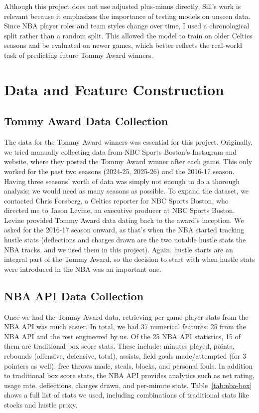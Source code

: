 \documentclass[11pt]{article}
\begin{document}
Although this project does not use adjusted plus-minus directly, Sill's work is relevant because it emphasizes the importance of testing models on unseen data. Since NBA player roles and team styles change over time, I used a chronological split rather than a random split. This allowed the model to train on older Celtics seasons and be evaluated on newer games, which better reflects the real-world task of predicting future Tommy Award winners.

\section{Data and Feature Construction}

\subsection{Tommy Award Data Collection}
The data for the Tommy Award winners was essential for this project. Originally, we tried manually collecting data from NBC Sports Boston's Instagram and website, where they posted the Tommy Award winner after each game. This only worked for the past two seasons (2024-25, 2025-26) and the 2016-17 season. Having three seasons' worth of data was simply not enough to do a thorough analysis; we would need as many seasons as possible. To expand the dataset, we contacted Chris Forsberg, a Celtics reporter for NBC Sports Boston, who directed me to Jason Levine, an executive producer at NBC Sports Boston. Levine provided Tommy Award data dating back to the award's inception. We asked for the 2016-17 season onward, as that's when the NBA started tracking hustle stats (deflections and charges drawn are the two notable hustle stats the NBA tracks, and we used them in this project). Again, hustle starts are an integral part of the Tommy Award, so the decision to start with when hustle stats were introduced in the NBA was an important one.

\subsection{NBA API Data Collection}
Once we had the Tommy Award data, retrieving per-game player stats from the NBA API was much easier. In total, we had 37 numerical features: 25 from the NBA API and the rest engineered by us. Of the 25 NBA API statistics, 15 of them are traditional box score stats. These include: minutes played, points, rebounds (offensive, defensive, total), assists, field goals made/attempted (for 3 pointers as well), free throws made, steals, blocks, and personal fouls. In addition to traditional box score stats, the NBA API provides analytics such as net rating, usage rate, deflections, charges drawn, and per-minute stats. Table~\ref{tab:nba-box} shows a full list of stats we used, including combinations of traditional stats like stocks and hustle proxy.
\end{document}
